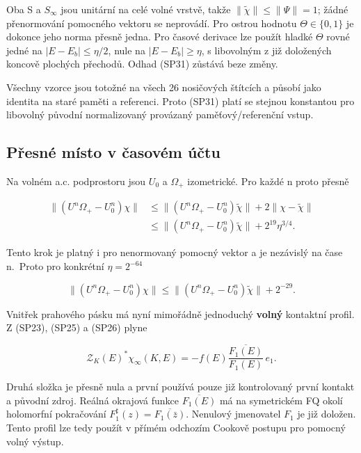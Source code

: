 \documentclass[11pt,a4paper]{article}
\theoremstyle{remark}\newtheorem{remark}[theorem]{Poznámka}
\numberwithin{equation}{section}
\begin{document}
Oba S a \(S_\infty\) jsou unitární na celé volné vrstvě, takže
\(\|\widetilde\chi\|\le\|\Psi\|=1\); žádné přenormování pomocného
vektoru se neprovádí. Pro ostrou hodnotu \(\Theta\in\{0,1\}\) je dokonce
jeho norma přesně jedna. Pro časové derivace lze použít hladké
\(\Theta\) rovné jedné na \(|E-E_b|\le\eta/2\), nule na
\(|E-E_b|\ge\eta\), s libovolným z již doložených koncově plochých
přechodů. Odhad (SP31) zůstává beze změny.

Všechny vzorce jsou totožné na všech 26 nosičových štítcích a působí
jako identita na staré paměti a referenci. Proto (SP31) platí se stejnou
konstantou pro libovolný původní normalizovaný provázaný
paměťový/referenční vstup.

\hypertarget{pux159esnuxe9-muxedsto-v-ux10dasovuxe9m-uxfaux10dtu}{%
\subsection{Přesné místo v časovém
účtu}\label{pux159esnuxe9-muxedsto-v-ux10dasovuxe9m-uxfaux10dtu}}

Na volném a.c. podprostoru jsou \(U_0\) a \(\Omega_+\) izometrické. Pro
každé n proto přesně

\[
\begin{aligned}
\|(U^n\Omega_+-U_0^n)\chi\|
&\le\|(U^n\Omega_+-U_0^n)\widetilde\chi\|
+2\|\chi-\widetilde\chi\|\\
&\le\|(U^n\Omega_+-U_0^n)\widetilde\chi\|
+2^{19}\eta^{3/4}.
\end{aligned}
\tag{SP32}
\]

Tento krok je platný i pro nenormovaný pomocný vektor a je nezávislý na
čase n.~Proto pro konkrétní \(\eta=2^{-64}\)

\[
\boxed{
\|(U^n\Omega_+-U_0^n)\chi\|
\le\|(U^n\Omega_+-U_0^n)\widetilde\chi\|+2^{-29}.}
\tag{SP33}
\]

Vnitřek prahového pásku má nyní mimořádně jednoduchý \textbf{volný}
kontaktní profil. Z (SP23), (SP25) a (SP26) plyne

\[
\boxed{
\mathcal Z_K(E)^*\chi_\infty(K,E)
=-f(E)\frac{\overline{F_1(E)}}{F_1(E)}\,e_1.}
\tag{SP34}
\]

Druhá složka je přesně nula a první používá pouze již kontrolovaný první
kontakt a původní zdroj. Reálná okrajová funkce \(\overline{F_1(E)}\) má
na symetrickém FQ okolí holomorfní pokračování
\(F_1^\sharp(z)=\overline{F_1(\bar z)}\). Nenulový jmenovatel \(F_1\) je
již doložen. Tento profil lze tedy použít v přímém odchozím Cookově
postupu pro pomocný volný výstup.
\end{document}
